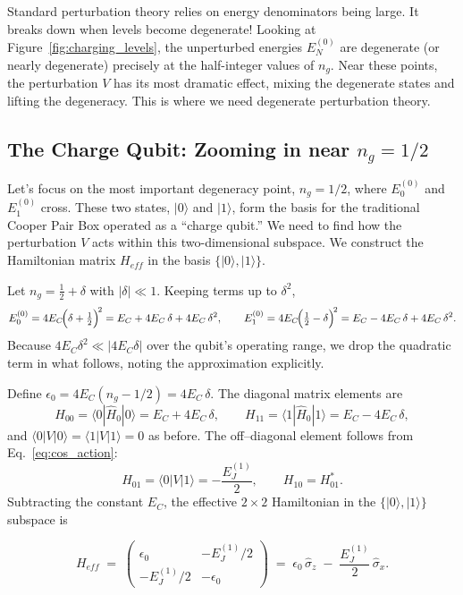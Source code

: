 \documentclass{book}
\begin{document}
Standard perturbation theory relies on energy denominators being large. It breaks down when levels become degenerate! Looking at Figure~\ref{fig:charging_levels}, the unperturbed energies \(E_N^{(0)}\) are degenerate (or nearly degenerate) precisely at the half-integer values of \(n_g\). Near these points, the perturbation \(V\) has its most dramatic effect, mixing the degenerate states and lifting the degeneracy. This is where we need degenerate perturbation theory.

\subsection[The Charge Qubit: Zooming in near ng = 1/2]{The Charge Qubit: Zooming in near \(n_g = 1/2\)}
\label{subsec:charge_qubit}

Let's focus on the most important degeneracy point, \(n_g = 1/2\), where \(E_0^{(0)}\) and \(E_1^{(0)}\) cross.  These two states, \(|0\rangle\) and \(|1\rangle\), form the basis for the traditional Cooper Pair Box operated as a “charge qubit.”  We need to find how the perturbation \(V\) acts within this two-dimensional subspace.  We construct the Hamiltonian matrix \(H_{eff}\) in the basis \(\{|0\rangle, |1\rangle\}\).

Let \(n_g = \tfrac12 + \delta\) with \(|\delta|\ll1\).  Keeping terms up to \(\delta^2\),
\[
E_0^{(0)} = 4E_C\!\Bigl(\delta+\tfrac12\Bigr)^{\!2}
          = E_C + 4E_C\,\delta + 4E_C\,\delta^{2},\qquad
E_1^{(0)} = 4E_C\!\Bigl(\tfrac12-\delta\Bigr)^{\!2}
          = E_C - 4E_C\,\delta + 4E_C\,\delta^{2}.
\]
Because \(4E_C\delta^{2}\ll|4E_C\delta|\) over the qubit’s operating range,
we drop the quadratic term in what follows, noting the approximation explicitly.

Define \(\epsilon_0 = 4E_C(n_g - 1/2) = 4E_C\,\delta\).  The diagonal matrix elements are
\[
H_{00} = \langle0|\hat H_0|0\rangle = E_C + 4E_C\,\delta,\qquad
H_{11} = \langle1|\hat H_0|1\rangle = E_C - 4E_C\,\delta,
\]
and \(\langle 0|V|0\rangle = \langle1|V|1\rangle = 0\) as before.  The off–diagonal element follows from Eq.~\ref{eq:cos_action}:
\[
H_{01} = \langle0|V|1\rangle = -\frac{E_J^{(1)}}{2}, 
\qquad
H_{10} = H_{01}^*.
\]
Subtracting the constant \(E_C\), the effective \(2\times2\) Hamiltonian in the \(\{|0\rangle,|1\rangle\}\) subspace is

\[
H_{eff} \;=\; 
\begin{pmatrix}
\epsilon_0 & -E_J^{(1)}/2\\
-E_J^{(1)}/2 & -\epsilon_0
\end{pmatrix}
\;=\;
\epsilon_0\,\hat\sigma_z \;-\;\frac{E_J^{(1)}}{2}\,\hat\sigma_x.
\]
\end{document}
